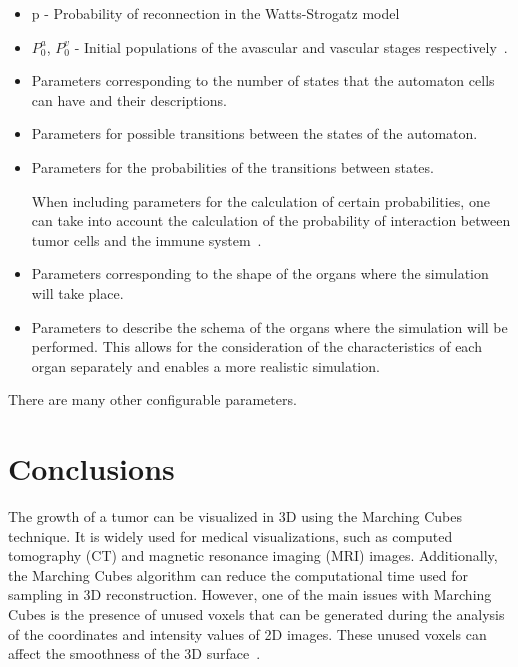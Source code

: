 \documentclass[a4paper,11pt]{article}
\begin{document}
{\begin{itemize}
    The ranges of values for the spatial components of the graph vertices are as follows: $0 \leq x \leq S_{x}$, $0 \leq y \leq S_{y}$ y $0 \leq z \leq S_{z}$.

    \item p - Probability of reconnection in the Watts-Strogatz model
    \item $P_0^a$, $P_0^v$ - Initial populations of the avascular and vascular stages respectively~\cite{7}.
    \item Parameters corresponding to the number of states that the automaton cells can have and their descriptions.
    \item Parameters for possible transitions between the states of the automaton.
    \item Parameters for the probabilities of the transitions between states.
    
    When including parameters for the calculation of certain probabilities, one can take into account the calculation of the probability of interaction between tumor cells and the immune system~\cite{6}.
    \item Parameters corresponding to the shape of the organs where the simulation will take place.
    \item Parameters to describe the schema of the organs where the simulation will be performed. This allows for the consideration of the characteristics of each organ separately and enables a more realistic simulation.
\end{itemize}

There are many other configurable parameters.\\

\section*{Conclusions}

The growth of a tumor can be visualized in 3D using the Marching Cubes technique. It is widely used for medical visualizations, such as computed tomography (CT) and magnetic resonance imaging (MRI) images. Additionally, the Marching Cubes algorithm can reduce the computational time used for sampling in 3D reconstruction. However, one of the main issues with Marching Cubes is the presence of unused voxels that can be generated during the analysis of the coordinates and intensity values of 2D images. These unused voxels can affect the smoothness of the 3D surface~\cite{8}.

}
\end{document}
